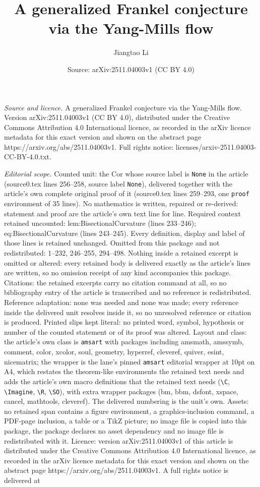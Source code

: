\documentclass[10pt,a4paper]{amsart}
\title[A generalized Frankel conjecture via the Yang-Mills flow]{A generalized Frankel conjecture via the Yang-Mills flow}
\author{Jiangtao Li}
\date{Source: arXiv:2511.04003v1 (CC BY 4.0)}
\begin{document}
\maketitle

\noindent\emph{Source and licence.} A generalized Frankel conjecture via the Yang-Mills flow. Version arXiv:2511.04003v1 (CC BY 4.0), distributed under the Creative Commons Attribution 4.0 International licence, as recorded in the arXiv licence metadata for this exact version and shown on the abstract page https://arxiv.org/abs/2511.04003v1. Full rights notice: licenses/arxiv-2511.04003-CC-BY-4.0.txt.\par\smallskip

\noindent\textit{Editorial scope.} Counted unit: the Cor whose source label is \texttt{None} in the article (source0.tex lines 256--258, source label \texttt{None}), delivered together with the article's own complete original proof of it (source0.tex lines 259--293, one \texttt{proof} environment of 35 lines). No mathematics is written, repaired or re-derived: statement and proof are the article's own text line for line. Required context retained uncounted: lem:BisectionalCurvature (lines 233--246); eq:BisectionalCurvature (lines 243--245). Every definition, display and label of those lines is retained unchanged. Omitted from this package and not redistributed: 1--232, 246--255, 294--498. Nothing inside a retained excerpt is omitted or altered: every retained body is delivered exactly as the article's lines are written, so no omission receipt of any kind accompanies this package. Citations: the retained excerpts carry no citation command at all, so no bibliography entry of the article is transcribed and no reference is redistributed. Reference adaptation: none was needed and none was made; every reference inside the delivered unit resolves inside it, so no unresolved reference or citation is produced. Printed slips kept literal: no printed word, symbol, hypothesis or number of the counted statement or of its proof was altered. Layout and class: the article's own class is \texttt{amsart} with packages including amsmath, amssymb, comment, color, xcolor, soul, geometry, hyperref, cleveref, quiver, esint, nicematrix; the wrapper is the lane's pinned \texttt{amsart} editorial wrapper at 10pt on A4, which restates the theorem-like environments the retained text needs and adds the article's own macro definitions that the retained text needs (\texttt{\textbackslash C}, \texttt{\textbackslash Imagine}, \texttt{\textbackslash R}, \texttt{\textbackslash SO}), with extra wrapper packages (bm, bbm, dsfont, xspace, cancel, mathtools, cleveref). The delivered numbering is the unit's own. Assets: no retained span contains a figure environment, a graphics-inclusion command, a PDF-page inclusion, a table or a TikZ picture; no image file is copied into this package, the package declares no asset dependency and no image file is redistributed with it. Licence: version arXiv:2511.04003v1 of this article is distributed under the Creative Commons Attribution 4.0 International licence, as recorded in the arXiv licence metadata for this exact version and shown on the abstract page https://arxiv.org/abs/2511.04003v1. A full rights notice is delivered at 
\end{document}
